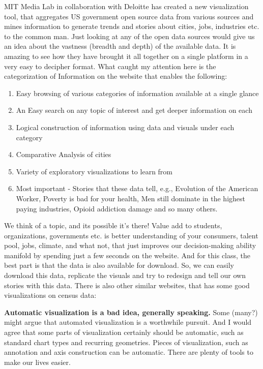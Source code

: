\documentclass[]{book}
\providecommand{\tightlist}{%
  \setlength{\itemsep}{0pt}\setlength{\parskip}{0pt}}
\theoremstyle{definition}
\theoremstyle{definition}
\theoremstyle{definition}
\theoremstyle{remark}
\begin{document}
\citep{DataUSA} MIT Media Lab in collaboration with Deloitte has created
a new visualization tool, that aggregates US government open source data
from various sources and mines information to generate trends and
stories about cities, jobs, industries etc. to the common man. Just
looking at any of the open data sources would give us an idea about the
vastness (breadth and depth) of the available data. It is amazing to see
how they have brought it all together on a single platform in a very
easy to decipher format. What caught my attention here is the
categorization of Information on the website that enables the following:

\begin{enumerate}
\def\labelenumi{\arabic{enumi}.}
\tightlist
\item
  Easy browsing of various categories of information available at a
  single glance
\item
  An Easy search on any topic of interest and get deeper information on
  each
\item
  Logical construction of information using data and visuals under each
  category
\item
  Comparative Analysis of cities
\item
  Variety of exploratory visualizations to learn from
\item
  Most important - Stories that these data tell, e.g., Evolution of the
  American Worker, Poverty is bad for your health, Men still dominate in
  the highest paying industries, Opioid addiction damage and so many
  others.
\end{enumerate}

We think of a topic, and its possible it's there! Value add to students,
organizations, governments etc. is better understanding of your
consumers, talent pool, jobs, climate, and what not, that just improves
our decision-making ability manifold by spending just a few seconds on
the website. And for this class, the best part is that the data is also
available for download. So, we can easily download this data, replicate
the visuals and try to redesign and tell our own stories with this data.
There is also other similar websites, that has some good visualizations
on census data: \citep{CensusDataViz}

\textbf{Automatic visualization is a bad idea, generally speaking.} Some
(many?) might argue that automated visualization is a worthwhile
pursuit. And I would agree that some parts of visualization certainly
should be automatic, such as standard chart types and recurring
geometries. Pieces of visualization, such as annotation and axis
construction can be automatic. There are plenty of tools to make our
lives easier.
\end{document}
